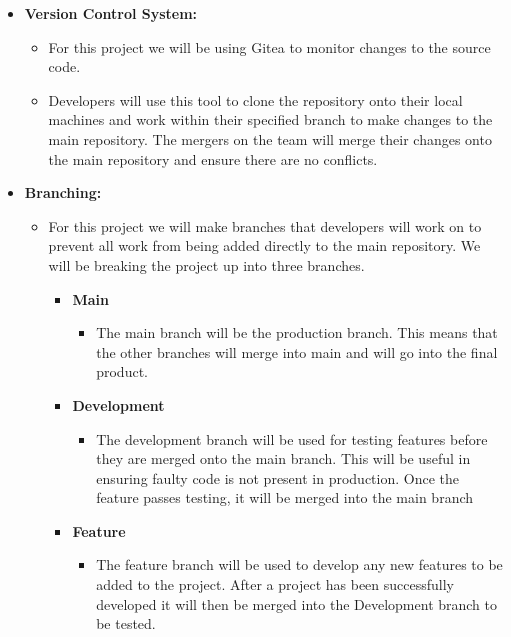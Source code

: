 \documentclass[letterpaper,12pt,oneside,listof=totoc]{scrreprt}
\begin{document}
\begin{itemize}
    \item \textbf{Version Control System:}
    \begin{itemize}
        \item For this project we will be using Gitea to monitor changes to the source code. 
        \item Developers will use this tool to clone the repository onto their local machines and work within their specified branch to make changes to the main repository. The mergers on the team will merge their changes onto the main repository and ensure there are no conflicts. 
    \end{itemize}
    \item \textbf{Branching:}
    \begin{itemize}
        \item For this project we will make branches that developers will work on to prevent all work from being added directly to the main repository. We will be breaking the project up into three branches. 
        \begin{itemize}
            \item \textbf{Main}
            \begin{itemize}
                \item The main branch will be the production branch. This means that the other branches will merge into main and will go into the final product. 
            \end{itemize}
        \end{itemize}
        \begin{itemize}
            \item \textbf{Development}
            \begin{itemize}
                \item The development branch will be used for testing features before they are merged onto the main branch. This will be useful in ensuring faulty code is not present in production. Once the feature passes testing, it will be merged into the main branch
            \end{itemize}
        \end{itemize}
        \begin{itemize}
            \item \textbf{Feature}
            \begin{itemize}
                \item The feature branch will be used to develop any new features to be added to the project. After a project has been successfully developed it will then be merged into the Development branch to be tested. 

\end{itemize}
\end{itemize}
\end{itemize}
\end{itemize}
\end{document}

